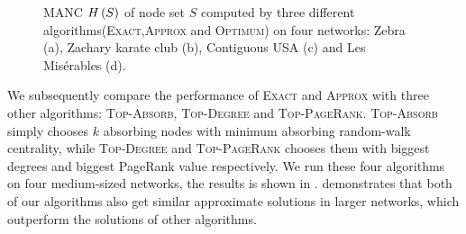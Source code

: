 \documentclass[sigconf]{acmart}
\begin{document}
\begin{figure}
    \caption{MANC \(H\left(S\right)\) of node set \(S\) computed by three different algorithms(\textsc{Exact},\textsc{Approx} and \textsc{Optimum}) on four networks: Zebra (a), Zachary karate club (b), Contiguous USA (c) and Les Misérables (d).\label{pic:compare-effect-optimum}}
\end{figure}

We subsequently compare the performance of \textsc{Exact} and \textsc{Approx} with three other algorithms: \textsc{Top-Absorb}, \textsc{Top-Degree} and \textsc{Top-PageRank}.
\textsc{Top-Absorb} simply chooses \(k\) absorbing nodes with minimum absorbing random-walk centrality, while \textsc{Top-Degree} and \textsc{Top-PageRank} chooses them with biggest degrees and biggest PageRank value respectively.
We run these four algorithms on four medium-sized networks, the results is shown in .
 demonstrates that both of our algorithms also get similar approximate solutions in larger networks, which outperform the solutions of other algorithms.
\end{document}

